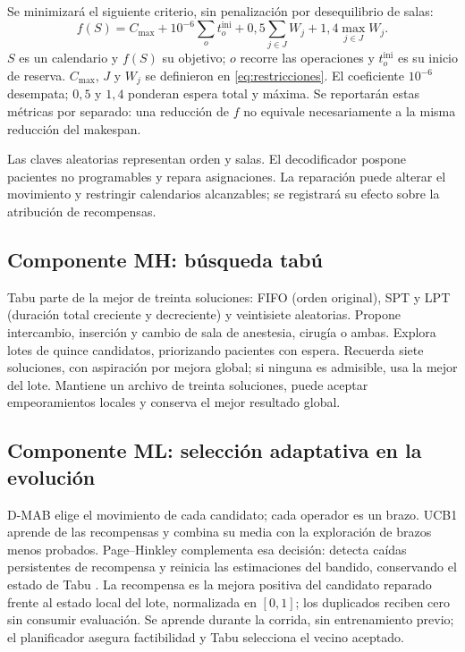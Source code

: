 \documentclass[12pt,letterpaper]{report}
\begin{document}
Se minimizará el siguiente criterio, sin penalización por desequilibrio de salas:
\begin{equation}
 f(S)=C_{\max}+10^{-6}\sum_o t_o^{\mathrm{ini}}
        +0{,}5\sum_{j\in J}W_j+1{,}4\max_{j\in J}W_j.
 \label{eq:objetivo}
\end{equation}
\noindent $S$ es un calendario y $f(S)$ su objetivo; $o$ recorre las
operaciones y $t_o^{\mathrm{ini}}$ es su inicio de reserva. $C_{\max}$, $J$
y $W_j$ se definieron en \eqref{eq:restricciones}. El coeficiente $10^{-6}$
desempata; $0{,}5$ y $1{,}4$ ponderan espera total y máxima. Se reportarán
estas métricas por separado: una reducción de $f$ no equivale necesariamente
a la misma reducción del makespan.

Las claves aleatorias representan orden y salas. El decodificador pospone
pacientes no programables y repara asignaciones. La reparación puede alterar
el movimiento y restringir calendarios alcanzables; se registrará su efecto
sobre la atribución de recompensas.

\subsection{Componente MH: búsqueda tabú}
Tabu parte de la mejor de treinta soluciones: FIFO (orden original),
SPT y LPT (duración total creciente y decreciente) y veintisiete aleatorias.
Propone intercambio, inserción y cambio de sala de anestesia,
cirugía o ambas. Explora lotes de quince candidatos, priorizando pacientes
con espera. Recuerda siete soluciones, con aspiración por mejora global;
si ninguna es admisible, usa la mejor del lote. Mantiene un archivo de
treinta soluciones, puede aceptar empeoramientos locales y conserva el
mejor resultado global.

\subsection{Componente ML: selección adaptativa en la evolución}
D-MAB elige el movimiento de cada candidato; cada operador es un brazo.
UCB1 aprende de las recompensas y combina su media con la exploración
de brazos menos probados. Page--Hinkley complementa esa decisión: detecta
caídas persistentes de recompensa y reinicia las estimaciones del bandido,
conservando el estado de Tabu \parencite{dacosta2008}.
La recompensa es la mejora positiva del candidato reparado frente al estado
local del lote, normalizada en $[0,1]$; los duplicados reciben cero sin
consumir evaluación. Se aprende durante la corrida, sin entrenamiento previo;
el planificador asegura factibilidad y Tabu selecciona el vecino aceptado.
\end{document}
